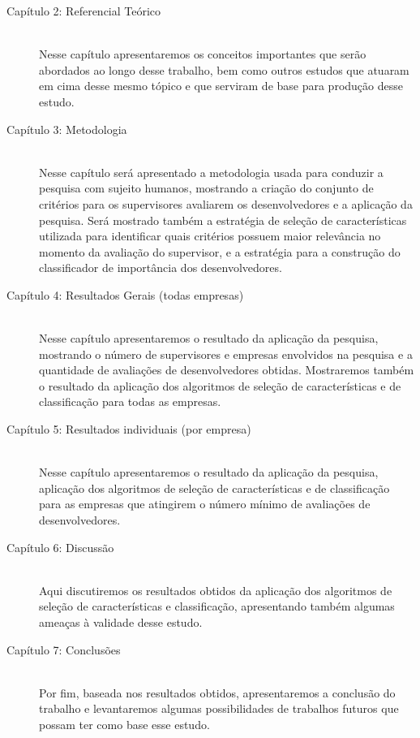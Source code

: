 \begin{description}
	\item[Capítulo 2: Referencial Teórico] \hfill \\
	Nesse capítulo apresentaremos os conceitos importantes que serão abordados ao longo desse trabalho, bem como outros estudos que atuaram em cima desse mesmo tópico e que serviram de base para produção desse estudo.
	
	\item [Capítulo 3: Metodologia] \hfill \\
	Nesse capítulo será apresentado a metodologia usada para conduzir a pesquisa com sujeito humanos, mostrando a criação do conjunto de critérios para os supervisores avaliarem os desenvolvedores e a aplicação da pesquisa. Será mostrado também a estratégia de seleção de características utilizada para identificar quais critérios possuem maior relevância no momento da avaliação do supervisor, e a estratégia para a construção do classificador  de importância dos desenvolvedores.
	
	\item[Capítulo 4: Resultados Gerais (todas empresas) ] \hfill \\
	Nesse capítulo apresentaremos o resultado da aplicação da pesquisa, mostrando o número de supervisores e empresas envolvidos na pesquisa e a quantidade de avaliações de desenvolvedores obtidas. Mostraremos também o resultado da aplicação dos algoritmos de seleção de características e de classificação para todas as empresas.
	
	\item[Capítulo 5: Resultados individuais (por empresa) ] \hfill \\
	Nesse capítulo apresentaremos o resultado da aplicação da pesquisa, aplicação dos algoritmos de seleção de características e de classificação para as empresas que atingirem o número mínimo de avaliações de desenvolvedores.
	
	\item[Capítulo 6: Discussão ] \hfill \\
	Aqui discutiremos os resultados obtidos da aplicação dos algoritmos de seleção de características e classificação, apresentando também algumas ameaças à validade desse estudo.
	
	\item[Capítulo 7: Conclusões ] \hfill \\
	Por fim, baseada nos resultados obtidos, apresentaremos a conclusão do trabalho e levantaremos algumas possibilidades de trabalhos futuros que possam ter como base esse estudo.
	
\end{description}

